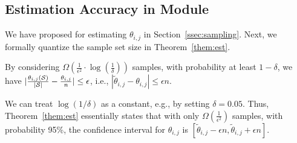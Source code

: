 \subsection{Estimation Accuracy in \sampling Module} \label{app:sampling}
We have proposed \sampling for estimating $\theta_{i,j}$ in Section~\ref{ssec:sampling}. Next, we formally quantize the sample set size in Theorem~\ref{them:est}.

\begin{theorem}\label{them:est}
By considering $\Omega(\frac{1}{\epsilon^2}\cdot \log(\frac{1}{\delta}))$ samples, with probability at least $1-\delta$, we have $|\frac{\theta_{i,j}({\mathcal{S}})}{|{\mathcal{S}}|}-\frac{\theta_{i,j}}{n}| \leq \epsilon$, i.e., $|\tilde{\theta}_{i,j}-\theta_{i,j}|\leq \epsilon n$.
\end{theorem}
\noindent We can treat $\log(1/\delta)$ as a constant, e.g., by setting $\delta = 0.05$. Thus, Theorem~\ref{them:est} essentially states that with only $\Omega(\frac{1}{\epsilon^2})$ samples, with probability 95\%, the confidence interval for $\theta_{i,j}$ is $[\tilde{\theta}_{i,j}-\epsilon n, \tilde{\theta}_{i,j}+\epsilon n]$.


